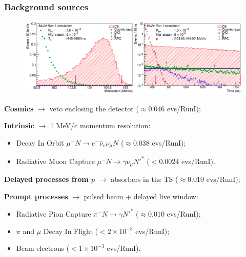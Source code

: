 \documentclass{beamer}
\begin{document}
\begin{frame}
    \frametitle{Background sources}
            \vspace{-3mm} 

         \begin{figure}[h]
            \centering
            \hspace*{-4ex}
            \includegraphics[width=1.\framewidth]{figures/png/Screenshot_20240225_102708.png}
        \end{figure}
        \setlength{\leftmargini}{-0.5em}
        \vspace{-3mm} 
      
    \begin{itemize}
      {\small
    \item \textbf{Cosmics} $\rightarrow$ veto enclosing the detector {\footnotesize($\approx$0.046 evs/RunI)};   
\item \textbf{Intrinsic} $\rightarrow$ 1 MeV/c momentum resolution:
\begin{itemize}
 \item Decay In Orbit $\mu^- N \rightarrow e^- \bar{\nu}_e\nu_\mu N $ {\footnotesize($\approx$0.038 evs/RunI)};
 \item Radiative Muon Capture $\mu^- N \rightarrow\gamma \nu_\mu N'^* $ {\footnotesize($<0.0024$ evs/RunI)}.
\end{itemize}
\item \textbf{Delayed processes from $\bar{p}$} $\rightarrow$ absorbers in the TS {\footnotesize($\approx0.010$ evs/RunI)};
\item \textbf{Prompt processes} $\rightarrow$ pulsed beam + delayed
live window:
\begin{itemize}
    \item Radiative Pion Capture $\pi^- N \rightarrow \gamma N' ^*$ {\footnotesize($\approx0.010$ evs/RunI)};
 \item $\pi$ and $\mu$ Decay In Flight {\footnotesize($<2\times 10^{-3}$ evs/RunI)};
 \item Beam electrons {\footnotesize($<1\times 10^{-3}$ evs/RunI)}.
     \end{itemize}
       }
      \end{itemize}
\end{frame}
\end{document}
